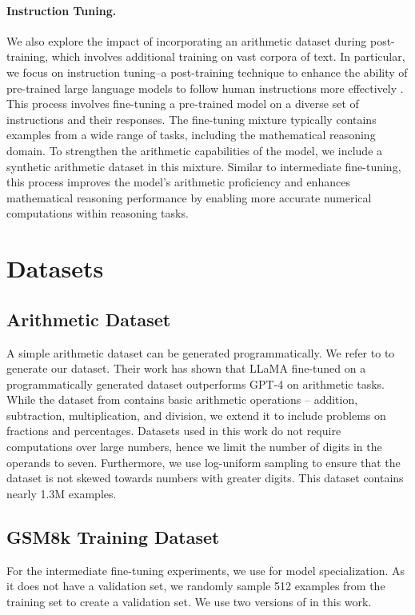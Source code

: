\paragraph{Instruction Tuning.}
We also explore the impact of incorporating an arithmetic dataset during post-training, which involves additional training on vast corpora of text. In particular, we focus on instruction tuning--a post-training technique to enhance the ability of pre-trained large language models to follow human instructions more effectively \citep{wei2021finetuned, chung2024scaling}. This process involves fine-tuning a pre-trained model on a diverse set of instructions and their responses. The fine-tuning mixture typically contains examples from a wide range of tasks, including the mathematical reasoning domain. To strengthen the arithmetic capabilities of the model, we include a synthetic arithmetic dataset in this mixture. Similar to intermediate fine-tuning, this process improves the model's arithmetic proficiency and enhances mathematical reasoning performance by enabling more accurate numerical computations within reasoning tasks.

\section{Datasets}
\subsection{Arithmetic Dataset}
A simple arithmetic dataset can be generated programmatically. We refer to \citet{liu2023goat} to generate our dataset. Their work has shown that LLaMA \citep{touvron2023llama} fine-tuned on a programmatically generated dataset outperforms GPT-4 \citep{achiam2023gpt} on arithmetic tasks. While the dataset from \citet{liu2023goat} contains basic arithmetic operations -- addition, subtraction, multiplication, and division, we extend it to include problems on fractions and percentages. Datasets used in this work do not require computations over large numbers, hence we limit the number of digits in the operands to seven. Furthermore, we use log-uniform sampling to ensure that the dataset is not skewed towards numbers with greater digits. This dataset contains nearly 1.3M examples.

\subsection{GSM8k Training Dataset}
For the intermediate fine-tuning experiments, we use \gsm{} for model specialization. As it does not have a validation set, we randomly sample 512 examples from the training set to create a validation set. We use two versions of \gsm{} in this work.

